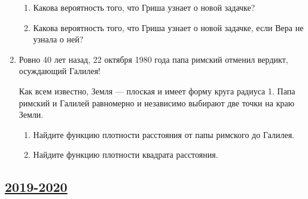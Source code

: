 \begin{enumerate}[resume]
    \begin{enumerate}
        \item Какова вероятность того, что Гриша узнает о новой задачке?
        \item Какова вероятность того, что Гриша узнает о новой задачке, если Вера не узнала о ней?
    \end{enumerate}
    
    \item Ровно 40 лет назад, 22 октября 1980 года папа римский отменил вердикт, осуждающий Галилея!


    Как всем известно, Земля — плоская и имеет форму круга радиуса 1. 
    Папа римский и Галилей равномерно и независимо выбирают две точки на краю Земли.

    \begin{enumerate}
        \item Найдите функцию плотности расстояния от папы римского до Галилея.
        \item Найдите функцию плотности квадрата расстояния.
    \end{enumerate}
    


\end{enumerate}



\subsection[2019-2020]{\hyperref[sec:sol_kr_01_ip_2019_2020]{2019-2020}}
\label{sec:kr_01_ip_2019_2020}


